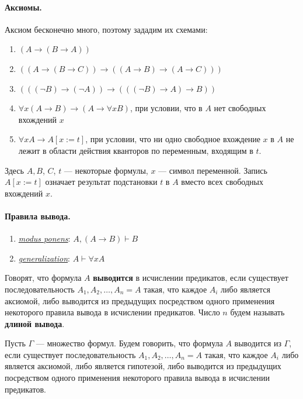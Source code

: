 \documentclass[11pt]{article}
\begin{document}
\paragraph{Аксиомы.} 
Аксиом бесконечно много, поэтому зададим их схемами:
\begin{enumerate}
    \item $(A \to (B \to A))$
    \item $((A \to (B \to C)) \to ((A \to B) \to (A \to C)))$
    \item $(((\lnot B) \to (\lnot A)) \to (((\lnot B) \to A) \to B))$
    \item $\forall x (A \to B) \to (A \to \forall x B)$, при условии, что в $A$ нет свободных вхождений $x$
    \item $\forall x A \to A[x := t]$, при условии, что ни одно свободное вхождение $x$ в $A$ не лежит в области действия кванторов по переменным, входящим в $t$.
\end{enumerate}
Здесь $A, B$, $C$, $t$ --- некоторые формулы, $x$ --- символ переменной. Запись $A[x := t]$ означает результат подстановки $t$ в $A$ вместо всех свободных вхождений $x$. 

\paragraph{Правила вывода.} 
\begin{enumerate}
    \item \underline{\textit{modus ponens}}: $A, (A \to B) \vdash B$
    \item \underline{\textit{generalization}}: $A \vdash \forall x A$
\end{enumerate}

\begin{definition}[Выводимость]
    Говорят, что формула $A$ \textbf{выводится} в исчислении предикатов, если 
    существует последовательность $A_1, A_2, \ldots, A_n = A$ такая, что каждое $A_i$ либо является аксиомой, либо выводится из предыдущих посредством одного применения некоторого правила вывода в исчислении предикатов.
    Число $n$ будем называть \textbf{длиной вывода}.
\end{definition}

\begin{definition}
    Пусть $\Gamma$ --- множество формул. Будем говорить, что формула $A$ выводится из $\Gamma$, если 
    существует последовательность $A_1, A_2, \ldots, A_n = A$ такая, что каждое $A_i$ либо является аксиомой, либо является гипотезой, либо выводится из предыдущих посредством одного применения некоторого правила вывода в исчислении предикатов.
\end{definition}
\end{document}
